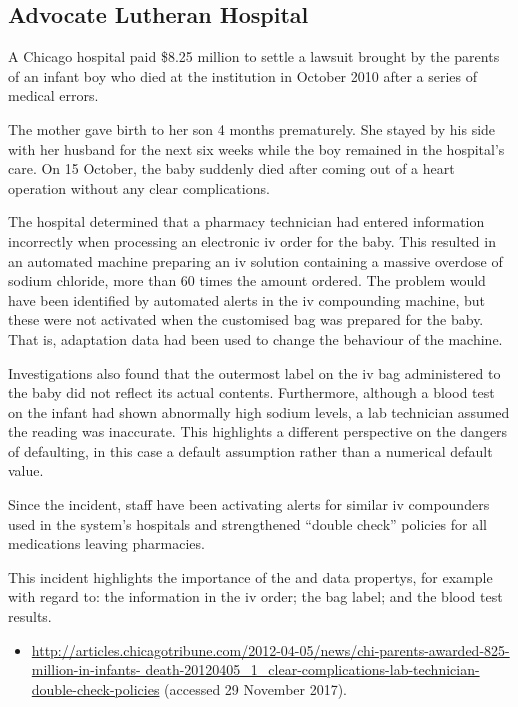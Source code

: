 \subsection{Advocate Lutheran Hospital} \label{bkm:incacc:advocatelutheran}
A Chicago hospital paid \$8.25 million to settle a lawsuit brought by the parents of an infant boy who died at the institution in October 2010 after a series of medical errors.

The mother gave birth to her son 4 months prematurely. She stayed by his side with her husband for the next six weeks while the boy remained in the hospital's care. On 15 October, the baby suddenly died after coming out of a heart operation without any clear complications.

The hospital determined that a pharmacy technician had entered \gls{information} incorrectly when processing an electronic \gls{iv} order for the baby. This resulted in an automated machine preparing an \gls{iv} solution containing a massive overdose of sodium chloride, more than 60 times the amount ordered. The problem would have been identified by automated alerts in the \gls{iv} compounding machine, but these were not activated when the customised bag was prepared for the baby. That is, \gls{adaptation data} had been used to change the behaviour of the machine.

Investigations also found that the outermost label on the \gls{iv} bag administered to the baby did not reflect its actual contents. Furthermore, although a blood test on the infant had shown abnormally high sodium levels, a lab technician assumed the reading was inaccurate. This highlights a different perspective on the dangers of defaulting, in this case a default assumption rather than a numerical default value.

Since the incident, staff have been activating alerts for similar \gls{iv} compounders used in the system's hospitals and strengthened ``double check'' policies for all medications leaving pharmacies.

This incident highlights the importance of the  and  \glspl{data property}, for example with regard to: the \gls{information} in the \gls{iv} order; the bag label; and the blood test results.

\begin{samepage}
\begin{itemize}
  \item \raggedright{\href{http://articles.chicagotribune.com/2012-04-05/news/chi-parents-awarded-825-million-in-infants-death-20120405_1_clear-complications-lab-technician-double-check-policies}{http://articles.chicagotribune.com/2012-04-05/news/chi-parents-awarded-825-million-in-infants- death-20120405\_1\_clear-complications-lab-technician-double-check-policies} (accessed 29 November 2017).}
\end{itemize}
\end{samepage}


